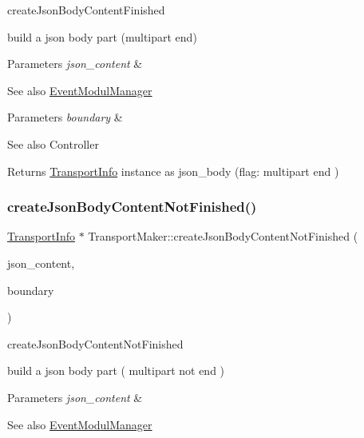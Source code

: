 create\+Json\+Body\+Content\+Finished 

build a json body part (multipart end) 
\begin{DoxyParams}{Parameters}
{\em json\+\_\+content} & \\
\hline
\end{DoxyParams}
\begin{DoxySeeAlso}{See also}
\hyperlink{classAlexaEvent_1_1EventModulManager}{Event\+Modul\+Manager} 
\end{DoxySeeAlso}

\begin{DoxyParams}{Parameters}
{\em boundary} & \\
\hline
\end{DoxyParams}
\begin{DoxySeeAlso}{See also}
Controller 
\end{DoxySeeAlso}
\begin{DoxyReturn}{Returns}
\hyperlink{classAlexaEvent_1_1TransportInfo}{Transport\+Info} instance as json\+\_\+body (flag\+: multipart end ) 
\end{DoxyReturn}
\mbox{\label{classAlexaEvent_1_1TransportMaker_a77baa31d47b9c6eff88b8499660752bf}} 
\subsubsection{\texorpdfstring{create\+Json\+Body\+Content\+Not\+Finished()}{createJsonBodyContentNotFinished()}}
{\footnotesize\ttfamily \hyperlink{classAlexaEvent_1_1TransportInfo}{Transport\+Info} $\ast$ Transport\+Maker\+::create\+Json\+Body\+Content\+Not\+Finished (\begin{DoxyParamCaption}\item[{\hyperlink{classAlexaEvent_1_1TransportInfo}{Transport\+Info} $\ast$}]{json\+\_\+content,  }\item[{const char $\ast$}]{boundary }\end{DoxyParamCaption})}



create\+Json\+Body\+Content\+Not\+Finished 

build a json body part ( multipart not end ) 
\begin{DoxyParams}{Parameters}
{\em json\+\_\+content} & \\
\hline
\end{DoxyParams}
\begin{DoxySeeAlso}{See also}
\hyperlink{classAlexaEvent_1_1EventModulManager}{Event\+Modul\+Manager} 
\end{DoxySeeAlso}

